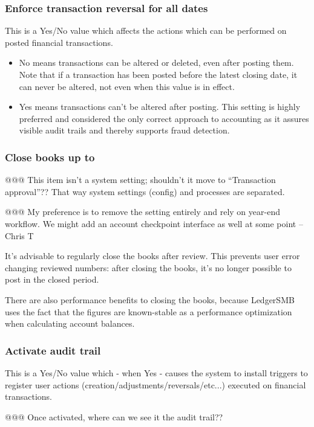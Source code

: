 \subsubsection{Enforce transaction reversal for all dates}

This is a Yes/No value which affects the actions which can be performed on posted financial transactions.
\begin{itemize}
\item No means transactions can be altered or deleted, even after posting them. Note that
if a transaction has been posted before the latest closing date, it can never be altered,
not even when this value is in effect.
\item Yes means transactions can't be altered after posting. This setting is highly preferred and considered the only correct approach to accounting as it assures visible
audit trails and thereby supports fraud detection.
\end{itemize}

\subsubsection{Close books up to}

@@@ This item isn't a system setting; shouldn't it move to ``Transaction approval''?? That way system settings (config) and processes are separated.

@@@ My preference is to remove the setting entirely and rely on year-end 
workflow.  We might add an account checkpoint interface as well at some point
--Chris T

It's advisable to regularly close the books after review. This prevents user error changing
reviewed numbers: after closing the books, it's no longer possible to post in the closed
period.

There are also performance benefits to closing the books, because LedgerSMB uses the
fact that the figures are known-stable as a performance optimization when calculating
account balances.

\subsubsection{Activate audit trail}

This is a Yes/No value which - when Yes - causes the system to install triggers to register
user actions (creation/adjustments/reversals/etc...) executed on financial transactions.


@@@ Once activated, where can we see it the audit trail??

